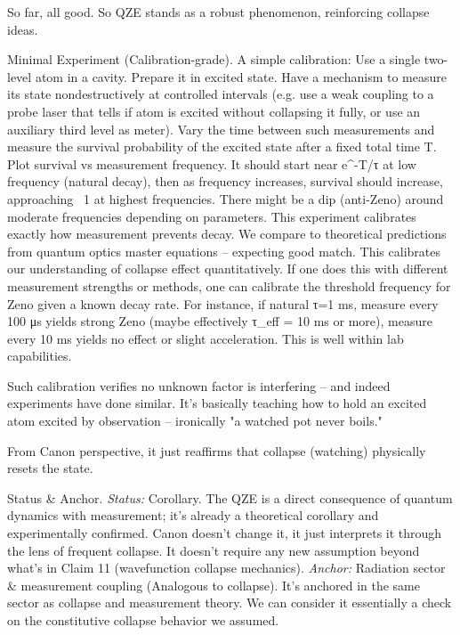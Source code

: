 \documentclass[11pt]{article}
\begin{document}
\begin{enumerate}
So far, all good. So QZE stands as a robust phenomenon, reinforcing collapse ideas.




\end{enumerate}

Minimal Experiment (Calibration-grade). A simple calibration: Use a single two-level atom in a cavity. Prepare it in excited state. Have a mechanism to measure its state nondestructively at controlled intervals (e.g. use a weak coupling to a probe laser that tells if atom is excited without collapsing it fully, or use an auxiliary third level as meter). Vary the time between such measurements and measure the survival probability of the excited state after a fixed total time T. Plot survival vs measurement frequency. It should start near e^{-T/τ} at low frequency (natural decay), then as frequency increases, survival should increase, approaching ~1 at highest frequencies. There might be a dip (anti-Zeno) around moderate frequencies depending on parameters. This experiment calibrates exactly how measurement prevents decay. We compare to theoretical predictions from quantum optics master equations – expecting good match. This calibrates our understanding of collapse effect quantitatively. If one does this with different measurement strengths or methods, one can calibrate the threshold frequency for Zeno given a known decay rate. For instance, if natural τ=1 ms, measure every 100 μs yields strong Zeno (maybe effectively τ_eff = 10 ms or more), measure every 10 ms yields no effect or slight acceleration. This is well within lab capabilities.

Such calibration verifies no unknown factor is interfering – and indeed experiments have done similar. It's basically teaching how to hold an excited atom excited by observation – ironically "a watched pot never boils."

From Canon perspective, it just reaffirms that collapse (watching) physically resets the state.


Status & Anchor. \textit{Status:} Corollary. The QZE is a direct consequence of quantum dynamics with measurement; it's already a theoretical corollary and experimentally confirmed. Canon doesn't change it, it just interprets it through the lens of frequent collapse. It doesn't require any new assumption beyond what's in Claim 11 (wavefunction collapse mechanics). \textit{Anchor:} Radiation sector & measurement coupling (Analogous to collapse). It's anchored in the same sector as collapse and measurement theory. We can consider it essentially a check on the constitutive collapse behavior we assumed.
\end{document}
